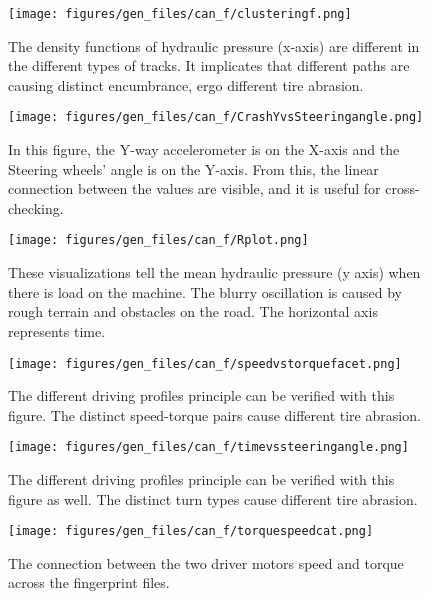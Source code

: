		\begin{figure}[H]
			\centering
			\texttt{[image: figures/gen\_files/can\_f/clusteringf.png]}
			\caption{The density functions of hydraulic pressure (x-axis) are different in the different types of tracks. It implicates that different paths are causing distinct encumbrance, ergo different tire abrasion.\label{implementation:pressure}} 
			\end{figure}
		\begin{figure}[H]
			\centering
			\texttt{[image: figures/gen\_files/can\_f/CrashYvsSteeringangle.png]}
			\caption{In this figure, the Y-way accelerometer is on the X-axis and the Steering wheels' angle is on the Y-axis. From this, the linear connection between the values are visible, and it is useful for cross-checking.\label{implementation:Crash}} 
			\end{figure}
		\begin{figure}[H]
			\centering
			\texttt{[image: figures/gen\_files/can\_f/Rplot.png]}
			\caption{These visualizations tell the mean hydraulic pressure (y axis) when there is load on the machine. The blurry oscillation is caused by rough terrain and obstacles on the road. The horizontal axis represents time.\label{implementation:loadon}} 
			\end{figure}		
		\begin{figure}[H]
			\centering
			\texttt{[image: figures/gen\_files/can\_f/speedvstorquefacet.png]}
			\caption{The different driving profiles principle can be verified with this figure. The distinct speed-torque pairs cause different tire abrasion.\label{implementation:svst}} 
			\end{figure}	
		\begin{figure}[H]
			\centering
			\texttt{[image: figures/gen\_files/can\_f/timevssteeringangle.png]}
			\caption{The different driving profiles principle can be verified with this figure as well. The distinct turn types cause different tire abrasion.\label{implementation:timevssteeringangle}} 
			\end{figure}	
		\begin{figure}[H]
			\centering
			\texttt{[image: figures/gen\_files/can\_f/torquespeedcat.png]}
			\caption{The connection between the two driver motors speed and torque across the fingerprint files.\label{implementation:tands}} 
			\end{figure}		
